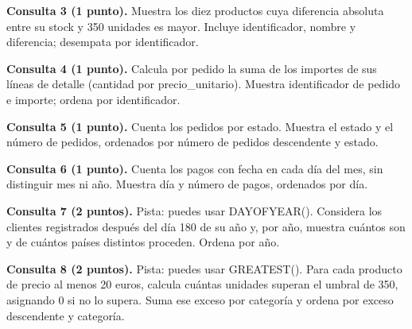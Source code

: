 \documentclass[12pt,a4paper]{article}
\begin{document}
\textbf{Consulta 3 (1 punto).} Muestra los diez productos cuya diferencia absoluta entre su stock y 350 unidades es mayor. Incluye identificador, nombre y diferencia; desempata por identificador.\par\vspace{0.65em}
\textbf{Consulta 4 (1 punto).} Calcula por pedido la suma de los importes de sus líneas de detalle (cantidad por precio\_unitario). Muestra identificador de pedido e importe; ordena por identificador.\par\vspace{0.65em}
\textbf{Consulta 5 (1 punto).} Cuenta los pedidos por estado. Muestra el estado y el número de pedidos, ordenados por número de pedidos descendente y estado.\par\vspace{0.65em}
\textbf{Consulta 6 (1 punto).} Cuenta los pagos con fecha en cada día del mes, sin distinguir mes ni año. Muestra día y número de pagos, ordenados por día.\par\vspace{0.65em}
\textbf{Consulta 7 (2 puntos).} Pista: puedes usar DAYOFYEAR(). Considera los clientes registrados después del día 180 de su año y, por año, muestra cuántos son y de cuántos países distintos proceden. Ordena por año.\par\vspace{0.65em}
\textbf{Consulta 8 (2 puntos).} Pista: puedes usar GREATEST(). Para cada producto de precio al menos 20 euros, calcula cuántas unidades superan el umbral de 350, asignando 0 si no lo supera. Suma ese exceso por categoría y ordena por exceso descendente y categoría.\par\vspace{0.65em}
\end{document}
